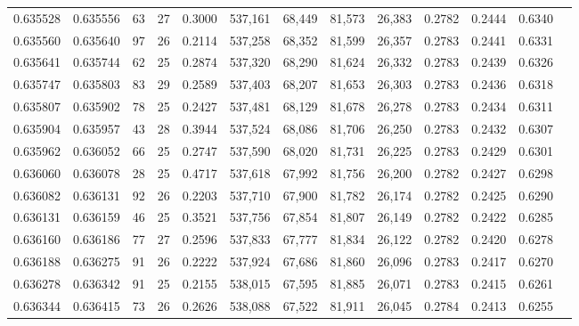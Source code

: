 \begin{tabular}{rrrrrrrrrrrrr}
0.635528 & 0.635556 &  63 &  27 &                                     0.3000 & 537,161 &  68,449 &  81,573 &  26,383 & 0.2782 & 0.2444 & 0.6340 \\
0.635560 & 0.635640 &  97 &  26 &                                     0.2114 & 537,258 &  68,352 &  81,599 &  26,357 & 0.2783 & 0.2441 & 0.6331 \\
0.635641 & 0.635744 &  62 &  25 &                                     0.2874 & 537,320 &  68,290 &  81,624 &  26,332 & 0.2783 & 0.2439 & 0.6326 \\
0.635747 & 0.635803 &  83 &  29 &                                     0.2589 & 537,403 &  68,207 &  81,653 &  26,303 & 0.2783 & 0.2436 & 0.6318 \\
0.635807 & 0.635902 &  78 &  25 &                                     0.2427 & 537,481 &  68,129 &  81,678 &  26,278 & 0.2783 & 0.2434 & 0.6311 \\
0.635904 & 0.635957 &  43 &  28 &                                     0.3944 & 537,524 &  68,086 &  81,706 &  26,250 & 0.2783 & 0.2432 & 0.6307 \\
0.635962 & 0.636052 &  66 &  25 &                                     0.2747 & 537,590 &  68,020 &  81,731 &  26,225 & 0.2783 & 0.2429 & 0.6301 \\
0.636060 & 0.636078 &  28 &  25 &                                     0.4717 & 537,618 &  67,992 &  81,756 &  26,200 & 0.2782 & 0.2427 & 0.6298 \\
0.636082 & 0.636131 &  92 &  26 &                                     0.2203 & 537,710 &  67,900 &  81,782 &  26,174 & 0.2782 & 0.2425 & 0.6290 \\
0.636131 & 0.636159 &  46 &  25 &                                     0.3521 & 537,756 &  67,854 &  81,807 &  26,149 & 0.2782 & 0.2422 & 0.6285 \\
0.636160 & 0.636186 &  77 &  27 &                                     0.2596 & 537,833 &  67,777 &  81,834 &  26,122 & 0.2782 & 0.2420 & 0.6278 \\
0.636188 & 0.636275 &  91 &  26 &                                     0.2222 & 537,924 &  67,686 &  81,860 &  26,096 & 0.2783 & 0.2417 & 0.6270 \\
0.636278 & 0.636342 &  91 &  25 &                                     0.2155 & 538,015 &  67,595 &  81,885 &  26,071 & 0.2783 & 0.2415 & 0.6261 \\
0.636344 & 0.636415 &  73 &  26 &                                     0.2626 & 538,088 &  67,522 &  81,911 &  26,045 & 0.2784 & 0.2413 & 0.6255 \\

\end{tabular}
